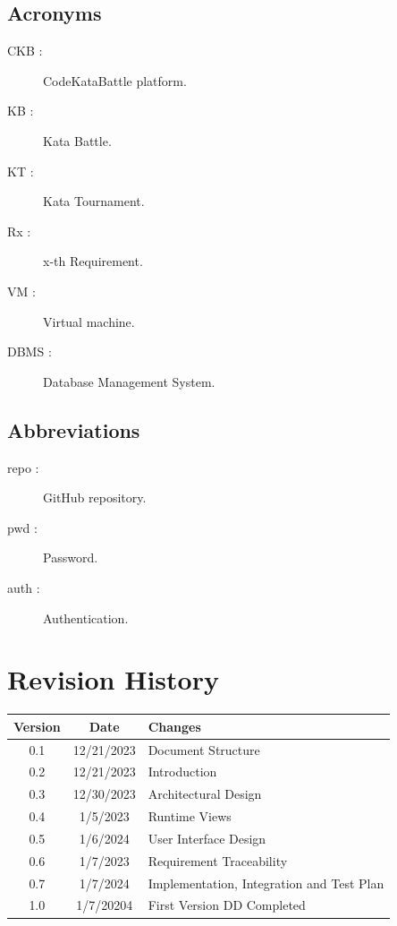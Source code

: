 \documentclass[11pt]{report}
\begin{document}
\subsection{Acronyms}

\begin{description}
    \item[CKB :] CodeKataBattle platform.
    \item[KB :] Kata Battle.
    \item[KT :] Kata Tournament.
    \item[Rx :] x-th Requirement.
    \item[VM :] Virtual machine.
    \item[DBMS :] Database Management System.
\end{description}

\subsection{Abbreviations}

\begin{description}
    \item[repo :] GitHub repository.
    \item[pwd :] Password.
    \item[auth :] Authentication.
\end{description}

\section{Revision History}

\begin{center}
\begin{tabular}{|c|c|p{9cm}|}
    \hline
    \rowcolor{gray!20}
    \textbf{Version} & \textbf{Date} & \textbf{Changes} \\
    \hline
    0.1 & 12/21/2023 & Document Structure\\
    \hline
    0.2 & 12/21/2023 & Introduction\\
    \hline
    0.3 & 12/30/2023 & Architectural Design\\
    \hline
    0.4 & 1/5/2023 & Runtime Views\\
    \hline
    0.5 & 1/6/2024 & User Interface Design\\
    \hline
    0.6 & 1/7/2023 & Requirement Traceability\\
    \hline
    0.7 & 1/7/2024 & Implementation, Integration and Test Plan\\
    \hline
    1.0 & 1/7/20204 & First Version DD Completed\\ 
    \hline
\end{tabular}
\end{center}
\end{document}
